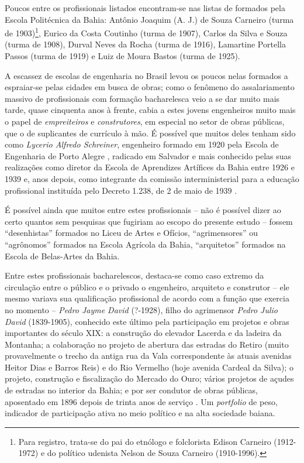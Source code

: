 Poucos entre os profissionais listados encontram-se nas listas de formados pela Escola Politécnica da Bahia: Antônio Joaquim (A. J.) de Souza Carneiro (turma de 1903)\footnote{Para registro, trata-se do pai do etnólogo e folclorista Edison Carneiro (1912-1972) e do político udenista Nelson de Souza Carneiro (1910-1996).}, Eurico da Costa Coutinho (turma de 1907), Carlos da Silva e Souza (turma de 1908), Durval Neves da Rocha (turma de 1916), Lamartine Portella Passos (turma de 1919) e Luiz de Moura Bastos (turma de 1925). 

A escassez de escolas de engenharia no Brasil levou os poucos nelas formados a espraiar-se pelas cidades em busca de obras; como o fenômeno do assalariamento massivo de profissionais com formação bacharelesca veio a se dar muito mais tarde, quase cinquenta anos à frente, cabia a estes jovens engenheiros muito mais o papel de \textit{empreiteiros} e \textit{construtores}, em especial no setor de obras públicas, que o de suplicantes de currículo à mão. É possível que muitos deles tenham sido como \textit{Lycerio Alfredo Schreiner}, engenheiro formado em 1920 pela Escola de Engenharia de Porto Alegre \cite{lersch_engenhariapoa_2014}, radicado em Salvador e mais conhecido pelas suas realizações como diretor da Escola de Aprendizes Artífices da Bahia entre 1926 e 1939 \cite{moreira_escolaartifices_2009} e, anos depois, como integrante da comissão interministerial para a educação profissional instituída pelo Decreto 1.238, de 2 de maio de 1939 \cite[p.~184]{almeida_ensinoindustrial_2010}. 

É possível ainda que muitos entre estes profissionais -- não é possível dizer ao certo quantos sem pesquisas que fugiriam ao escopo do presente estudo -- fossem ``desenhistas'' formados no Liceu de Artes e Ofícios, ``agrimensores'' ou  ``agrônomos'' formados na Escola Agrícola da Bahia, ``arquitetos'' formados na Escola de Belas-Artes da Bahia. 

Entre estes profissionais bacharelescos, destaca-se como caso extremo da circulação entre o público e o privado o engenheiro, arquiteto e construtor -- ele mesmo variava sua qualificação profissional de acordo com a função que exercia no momento -- \textit{Pedro Jayme David} (?-1928), filho do agrimensor \textit{Pedro Julio David} (1839-1905), conhecido este último pela participação em projetos e obras importantes do século XIX: a construção do elevador Lacerda e da ladeira da Montanha; a colaboração no projeto de abertura das estradas do Retiro (muito provavelmente o trecho da antiga rua da Vala correspondente às atuais avenidas Heitor Dias e Barros Reis) e do Rio Vermelho (hoje avenida Cardeal da Silva); o projeto, construção e fiscalização do Mercado do Ouro; vários projetos de açudes de estradas no interior da Bahia; e por ser condutor de obras públicas, aposentado em 1896 depois de trinta anos de serviço \cite[pp.~327-328]{querino_artistas_2018}. Um \textit{portfolio} de peso, indicador de participação ativa no meio político e na alta sociedade baiana.

